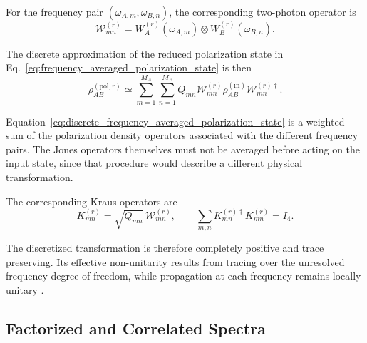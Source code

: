 For the frequency pair
\((\omega_{A,m},\omega_{B,n})\), the corresponding two-photon operator is
%
\begin{equation}
    \mathcal{W}_{mn}^{(r)}
    =
    W_A^{(r)}(\omega_{A,m})
    \otimes
    W_B^{(r)}(\omega_{B,n}).
    \label{eq:discrete_two_photon_polarization_operator}
\end{equation}

The discrete approximation of the reduced polarization state in
Eq.~\eqref{eq:frequency_averaged_polarization_state} is then
%
\begin{equation}
    \rho_{AB}^{(\mathrm{pol},r)}
    \simeq
    \sum_{m=1}^{M_A}
    \sum_{n=1}^{M_B}
    Q_{mn}
    \mathcal{W}_{mn}^{(r)}
    \rho_{AB}^{(\mathrm{in})}
    \mathcal{W}_{mn}^{(r)\dagger}.
    \label{eq:discrete_frequency_averaged_polarization_state}
\end{equation}

Equation~\eqref{eq:discrete_frequency_averaged_polarization_state}
is a weighted sum of the polarization density operators associated with the
different frequency pairs. The Jones operators themselves must not be
averaged before acting on the input state, since that procedure would
describe a different physical transformation.

The corresponding Kraus operators are
%
\begin{equation}
    K_{mn}^{(r)}
    =
    \sqrt{Q_{mn}}\,
    \mathcal{W}_{mn}^{(r)},
    \qquad
    \sum_{m,n}
    K_{mn}^{(r)\dagger}K_{mn}^{(r)}
    =
    I_4.
    \label{eq:discrete_spectral_kraus_operators}
\end{equation}

The discretized transformation is therefore completely positive and trace
preserving. Its effective non-unitarity results from tracing over the
unresolved frequency degree of freedom, while propagation at each frequency
remains locally unitary
\cite{nielsen_chuang_qcqi,
poon_law_stochastic_pmd_2008,
riccardi_polarization_entanglement_distribution_2021}.


\subsection{Factorized and Correlated Spectra}
\label{subsec:factorized_correlated_spectral_sampling}

